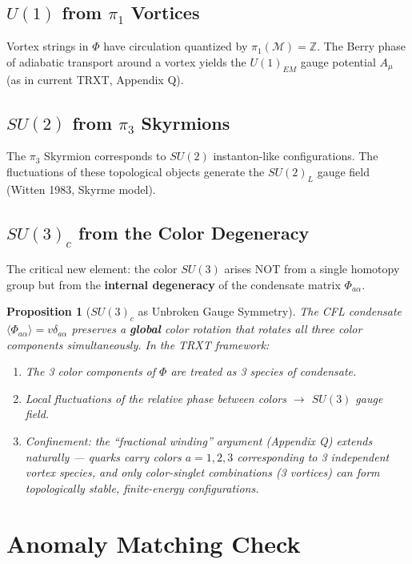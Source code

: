 \documentclass[12pt]{article}
\newtheorem{proposition}{Proposition}
\begin{document}
\subsection{$U(1)$ from $\pi_1$ Vortices}
Vortex strings in $\Phi$ have circulation quantized by $\pi_1(\mathcal{M}) = \mathbb{Z}$. The Berry phase of adiabatic transport around a vortex yields the $U(1)_{EM}$ gauge potential $A_\mu$ (as in current TRXT, Appendix Q).

\subsection{$SU(2)$ from $\pi_3$ Skyrmions}
The $\pi_3$ Skyrmion corresponds to $SU(2)$ instanton-like configurations. The fluctuations of these topological objects generate the $SU(2)_L$ gauge field (Witten 1983, Skyrme model).

\subsection{$SU(3)_c$ from the Color Degeneracy}
The critical new element: the color $SU(3)$ arises NOT from a single homotopy group but from the \textbf{internal degeneracy} of the condensate matrix $\Phi_{a\alpha}$.

\begin{proposition}[$SU(3)_c$ as Unbroken Gauge Symmetry]
The CFL condensate $\langle \Phi_{a\alpha} \rangle = v \delta_{a\alpha}$ preserves a \textbf{global} color rotation that rotates all three color components simultaneously. In the TRXT framework:

\begin{enumerate}
    \item The 3 color components of $\Phi$ are treated as 3 species of condensate.
    \item Local fluctuations of the relative phase between colors $\to$ $SU(3)$ gauge field.
    \item Confinement: the ``fractional winding'' argument (Appendix Q) extends naturally — quarks carry colors $a = 1,2,3$ corresponding to 3 independent vortex species, and only color-singlet combinations (3 vortices) can form topologically stable, finite-energy configurations.
\end{enumerate}
\end{proposition}

\section{Anomaly Matching Check}
\end{document}
